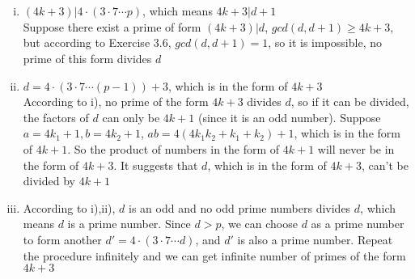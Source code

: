 \documentclass{article}
\begin{document}
\section{}
\begin{enumerate}[i)]
\item
$(4k+3)|4\cdot(3\cdot7\cdots p)$, which means $4k+3|d+1$\\
Suppose there exist a prime of form $(4k+3)|d$, $gcd(d,d+1)\geqslant4k+3$, but according to Exercise 3.6, $gcd(d,d+1)=1$, so it is impossible, no prime of this form divides $d$
\item
$d=4\cdot(3\cdot7\cdots(p-1))+3$, which is in the form of $4k+3$\\
According to i), no prime of the form $4k+3$ divides $d$, so if it can be divided, the factors of $d$ can only be $4k+1$ (since it is an odd number). Suppose $a=4k_1+1,b=4k_2+1$, $ab=4(4k_1k_2+k_1+k_2)+1$, which is in the form of $4k+1$. So the product of numbers in the form of $4k+1$ will never be in the form of $4k+3$. It suggests that $d$, which is in the form of $4k+3$, can't be divided by $4k+1$
\item
According to i),ii), $d$ is an odd and no odd prime numbers divides $d$, which means $d$ is a prime number. Since $d>p$, we can choose $d$ as a prime number to form another $d'=4\cdot(3\cdot7\cdots d)$, and $d'$ is also a prime number. Repeat the procedure infinitely and we can get infinite number of primes of the form $4k+3$
\end{enumerate}
\end{document}
